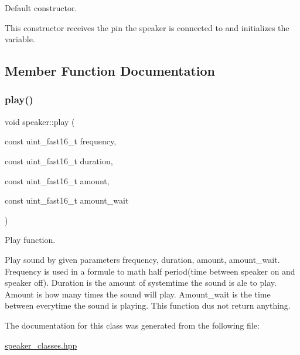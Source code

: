 Default constructor. 

This constructor receives the pin the speaker is connected to and initializes the variable. 

\subsection{Member Function Documentation}
\hypertarget{classspeaker_a625c84e34f9ee40a7baeb2d6baa816a1}{}\label{classspeaker_a625c84e34f9ee40a7baeb2d6baa816a1} 
\subsubsection{\texorpdfstring{play()}{play()}}
{\footnotesize\ttfamily void speaker\+::play (\begin{DoxyParamCaption}\item[{const uint\+\_\+fast16\+\_\+t}]{frequency,  }\item[{const uint\+\_\+fast16\+\_\+t}]{duration,  }\item[{const uint\+\_\+fast16\+\_\+t}]{amount,  }\item[{const uint\+\_\+fast16\+\_\+t}]{amount\+\_\+wait }\end{DoxyParamCaption})\hspace{0.3cm}{\ttfamily [inline]}}



Play function. 

Play sound by given parameters frequency, duration, amount, amount\+\_\+wait. Frequency is used in a formule to math half period(time between speaker on and speaker off). Duration is the amount of systemtime the sound is ale to play. Amount is how many times the sound will play. Amount\+\_\+wait is the time between everytime the sound is playing. This function dus not return anything. 

The documentation for this class was generated from the following file\+:\begin{DoxyCompactItemize}
\item 
\hyperlink{speaker__classes_8hpp}{speaker\+\_\+classes.\+hpp}\end{DoxyCompactItemize}
